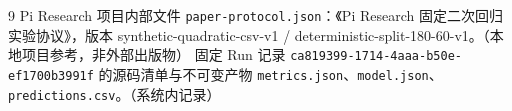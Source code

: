 \documentclass[a4paper,11pt]{article}
\begin{document}
\begin{thebibliography}{9}
 Pi Research 项目内部文件 \texttt{paper-protocol.json}：《Pi Research 固定二次回归实验协议》，版本 synthetic-quadratic-csv-v1 / deterministic-split-180-60-v1。（本地项目参考，非外部出版物）
 固定 Run 记录 \texttt{ca819399-1714-4aaa-b50e-ef1700b3991f} 的源码清单与不可变产物 \texttt{metrics.json}、\texttt{model.json}、\texttt{predictions.csv}。（系统内记录）
\end{thebibliography}
\end{document}
